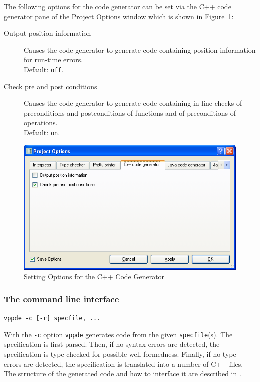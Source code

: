 \documentclass[\pformat,12pt]{article}
\newcommand{\vdmde}{vppde}
\newcommand{\guicmd}[1]{{\sf #1}}
\begin{document}
The following options for the code generator can be set via the
\guicmd{C++ code generator} pane of the \guicmd{Project Options} window
which is shown in Figure~\ref{fig:optccg}:


\begin{description}

\item[Output position information] Causes the code
  generator to generate code containing position information for
  run-time errors. \\
  Default: \texttt{off}. 
\item[Check pre and post conditions] Causes the code
  generator to generate code containing in-line checks of
  preconditions and postconditions of functions and of preconditions
  of operations. \\
  Default: \texttt{on}. 


\end{description}

\begin{figure}[tbh]
\begin{center}
\includegraphics[width=12cm]{ccgOptions-ppENG.png}
\caption{Setting Options for the C++ Code Generator}
\label{fig:optccg}
\end{center}
\end{figure}

\subsubsection{The command line interface}

{\tt \vdmde\ -c [-r] specfile, ...}

With the {\tt -c} option {\tt \vdmde} generates code from the given
{\tt specfile}(s). The specification is first parsed. Then, if no syntax
errors are detected, the specification is type checked for possible
well-formedness. Finally, if no type
errors are detected, the specification is translated into a number of
C++ files. The structure of the generated code and
how to interface it are described in
.
\end{document}
